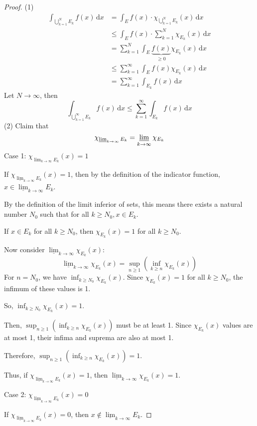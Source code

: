 \begin{proof}
(1)
\[
\begin{aligned}
\int_{\bigcup_{k=1}^{N} E_k}^{} f(x) \, \mathrm{d}x  & =\int_{E}^{} f(x)\cdot\chi_{\bigcup_{k=1}^{N} E_k}(x) \, \mathrm{d}x  \\
 & \leq \int_{E}^{}f(x)\cdot \sum_{k=1}^{N} \chi_{E_k}(x)  \, \mathrm{d}x  \\
 & =\sum_{k=1}^{N} \int_{E}^{} \underbrace{ f(x) }_{ \geq 0 }\chi_{E_k}(x) \, \mathrm{d}x  \\
 & \leq \sum_{k=1}^{\infty} \int_{E}^{} f(x)\chi_{E_k}(x)  \, \mathrm{d}x  \\
 & =\sum_{k=1}^{\infty} \int_{E_k}^{} f(x) \, \mathrm{d}x 
\end{aligned}
\]
Let $N\to \infty$, then
\[
\int_{\bigcup_{k=1}^{\infty} E_k}^{} f(x) \, \mathrm{d}x \leq \sum_{k=1}^{\infty} \int_{E_k}^{} f(x) \, \mathrm{d}x
\]
(2)
Claim that
\[
\chi_{\varliminf_{ k \to \infty } E_k}=\varliminf_{ k \to \infty } \chi _{E_k}
\]
Case 1: $\chi_{\lim_{k\to\infty}E_k}(x)=1$

If $\chi_{\underline{\lim}_{k\to\infty}E_k}(x)=1$, then by the definition of the indicator function, $x\in\underline{\lim}_{k\to\infty}E_k$.

By the definition of the limit inferior of sets, this means there exists a natural number $N_0$ such that for all $k\geq N_0,x\in E_k.$

If $x\in E_k$ for all $k\geq N_0$, then $\chi_{E_k}(x)=1$ for all $k\geq N_0.$

Now consider $\underline{\lim}_{k\to\infty}\chi_{E_k}(x)$:
\[
\underline{\lim}_{k\to\infty}\chi_{E_k}(x)=\sup_{n\geq1}(\inf_{k\geq n}\chi_{E_k}(x))
\]
For $n=N_0$, we have $\inf_{k\geq N_0}\chi_{E_k}(x).$ Since $\chi_{E_k}(x)=1$ for all $k\geq N_0$, the infimum of these values is 1.

So, $\inf_{k\geq N_0}\chi_{E_k}(x)=1.$

Then, $\sup_{n\geq1}(\inf_{k\geq n}\chi_{E_k}(x))$ must be at least 1. Since $\chi_{E_k}(x)$ values are at most 1, their infima and suprema are also at most 1.

Therefore, $\sup_{n\geq1}(\inf_{k\geq n}\chi_{E_k}(x))=1.$

Thus, if $\chi_{\underline{\lim}_{k\to\infty}E_k}(x)=1$, then $\underline{\lim}_{k\to\infty}\chi_{E_k}(x)=1.$

Case 2: $\chi_{\underline{\lim}_{k\to\infty}E_k}(x)=0$

If $\chi_{\underline{\lim}_{k\to\infty}E_k}(x)=0$, then $x\notin\underline{\lim}_{k\to\infty}E_k.$


\end{proof}
